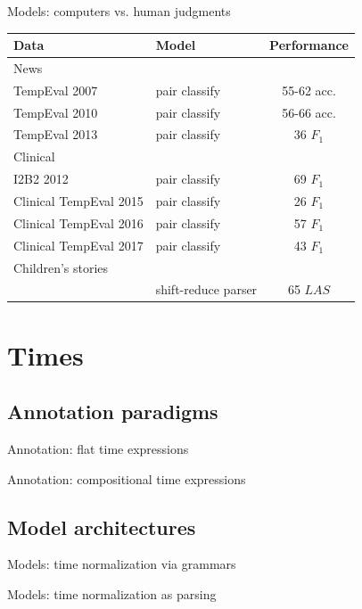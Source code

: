 \documentclass[12pt,compress]{beamer}
\begin{document}
\begin{frame}{Models: computers vs. human judgments}
\begin{tabular}{ l l c }
\hline\hline
Data & Model & Performance \\
\hline
News \\
\hline
TempEval 2007 & pair classify & 55-62 acc. \\
TempEval 2010 & pair classify & 56-66 acc. \\
TempEval 2013 & pair classify & 36 $F_1$ \\
\hline
\pause
Clinical \\
\hline
I2B2 2012 & pair classify & 69 $F_1$ \\
Clinical TempEval 2015 & pair classify & 26 $F_1$ \\
Clinical TempEval 2016 & pair classify & 57 $F_1$ \\
Clinical TempEval 2017 & pair classify & 43 $F_1$ \\
\hline
\pause
Children's stories \\
\hline
\cite{kolomiyets-etal:2012:ACL} & shift-reduce parser & 65 $LAS$ \\
\hline\hline
\end{tabular}
\end{frame}


\section{Times}


\subsection{Annotation paradigms}


\begin{frame}{Annotation: flat time expressions}
\end{frame}


\begin{frame}{Annotation: compositional time expressions}
\end{frame}


\subsection{Model architectures}


\begin{frame}{Models: time normalization via grammars}
\end{frame}


\begin{frame}{Models: time normalization as parsing}
\end{frame}
\end{document}
